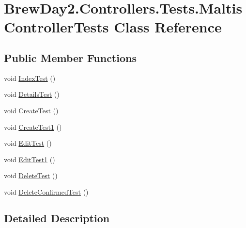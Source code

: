 \hypertarget{class_brew_day2_1_1_controllers_1_1_tests_1_1_maltis_controller_tests}{}\section{Brew\+Day2.\+Controllers.\+Tests.\+Maltis\+Controller\+Tests Class Reference}
\label{class_brew_day2_1_1_controllers_1_1_tests_1_1_maltis_controller_tests}
\subsection*{Public Member Functions}
\begin{DoxyCompactItemize}
\item 
void \mbox{\hyperlink{class_brew_day2_1_1_controllers_1_1_tests_1_1_maltis_controller_tests_a344da41462291004deb0c57515e2f69b}{Index\+Test}} ()
\item 
void \mbox{\hyperlink{class_brew_day2_1_1_controllers_1_1_tests_1_1_maltis_controller_tests_ad3b4782ff40a792c57bb7af9c6ba7ad3}{Details\+Test}} ()
\item 
void \mbox{\hyperlink{class_brew_day2_1_1_controllers_1_1_tests_1_1_maltis_controller_tests_aae9e4307679c8df1c9c40c3c091ad37d}{Create\+Test}} ()
\item 
void \mbox{\hyperlink{class_brew_day2_1_1_controllers_1_1_tests_1_1_maltis_controller_tests_a35533e99475cdeade40b9faf1fb1c5e7}{Create\+Test1}} ()
\item 
void \mbox{\hyperlink{class_brew_day2_1_1_controllers_1_1_tests_1_1_maltis_controller_tests_a98dd5b7775f086ad8547c9f683c4288c}{Edit\+Test}} ()
\item 
void \mbox{\hyperlink{class_brew_day2_1_1_controllers_1_1_tests_1_1_maltis_controller_tests_a1298da185e5df3b173831b9dfae3e5cb}{Edit\+Test1}} ()
\item 
void \mbox{\hyperlink{class_brew_day2_1_1_controllers_1_1_tests_1_1_maltis_controller_tests_a94149f0bb2921fb54e80178ca52a7742}{Delete\+Test}} ()
\item 
void \mbox{\hyperlink{class_brew_day2_1_1_controllers_1_1_tests_1_1_maltis_controller_tests_a83085a68bb30b8c5824ee3e34c9b56b7}{Delete\+Confirmed\+Test}} ()
\end{DoxyCompactItemize}


\subsection{Detailed Description}


